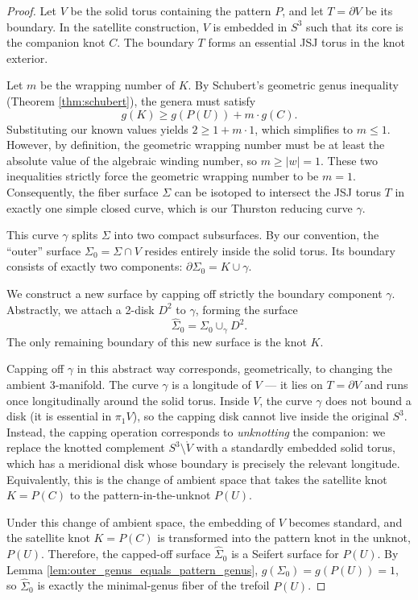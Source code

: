 \begin{proof}
    Let $V$ be the solid torus containing the pattern $P$, and let $T = \partial V$ be its boundary. In the satellite construction, $V$ is embedded in $S^3$ such that its core is the companion knot $C$. The boundary $T$ forms an essential JSJ torus in the knot exterior.

    Let $m$ be the wrapping number of $K$. By Schubert's geometric genus inequality (Theorem \ref{thm:schubert}), the genera must satisfy
    \[
    g(K) \geq g(P(U)) + m \cdot g(C).
    \]
    Substituting our known values yields $2 \geq 1 + m \cdot 1$, which simplifies to $m \leq 1$. However, by definition, the geometric wrapping number must be at least the absolute value of the algebraic winding number, so $m \geq |w| = 1$. These two inequalities strictly force the geometric wrapping number to be $m = 1$. Consequently, the fiber surface $\Sigma$ can be isotoped to intersect the JSJ torus $T$ in exactly one simple closed curve, which is our Thurston reducing curve $\gamma$.

    This curve $\gamma$ splits $\Sigma$ into two compact subsurfaces. By our convention, the ``outer'' surface $\Sigma_0 = \Sigma \cap V$ resides entirely inside the solid torus. Its boundary consists of exactly two components: $\partial \Sigma_0 = K \cup \gamma$.

    We construct a new surface by capping off strictly the boundary component $\gamma$. Abstractly, we attach a 2-disk $D^2$ to $\gamma$, forming the surface
    \[
    \widehat{\Sigma}_0 = \Sigma_0 \cup_{\gamma} D^2.
    \]
    The only remaining boundary of this new surface is the knot $K$.

    Capping off $\gamma$ in this abstract way corresponds, geometrically, to changing the ambient 3-manifold. The curve $\gamma$ is a longitude of $V$ --- it lies on $T = \partial V$ and runs once longitudinally around the solid torus. Inside $V$, the curve $\gamma$ does not bound a disk (it is essential in $\pi_1 V$), so the capping disk cannot live inside the original $S^3$. Instead, the capping operation corresponds to \emph{unknotting} the companion: we replace the knotted complement $S^3 \setminus \mathring{V}$ with a standardly embedded solid torus, which has a meridional disk whose boundary is precisely the relevant longitude. Equivalently, this is the change of ambient space that takes the satellite knot $K = P(C)$ to the pattern-in-the-unknot $P(U)$.

    Under this change of ambient space, the embedding of $V$ becomes standard, and the satellite knot $K = P(C)$ is transformed into the pattern knot in the unknot, $P(U)$. Therefore, the capped-off surface $\widehat{\Sigma}_0$ is a Seifert surface for $P(U)$. By Lemma \ref{lem:outer_genus_equals_pattern_genus}, $g(\Sigma_0) = g(P(U)) = 1$, so $\widehat{\Sigma}_0$ is exactly the minimal-genus fiber of the trefoil $P(U)$.


\end{proof}
